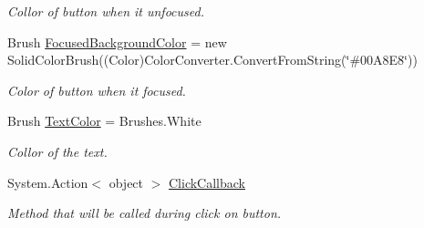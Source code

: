 \begin{DoxyCompactItemize}
\begin{DoxyCompactList}\small\item\em Collor of button when it unfocused. \end{DoxyCompactList}\item 
Brush \mbox{\hyperlink{class_teacher_handbook_1_1_controls_1_1_catalog_button_a5c4261e5d872e61b281085dc29971203}{Focused\+Background\+Color}} = new Solid\+Color\+Brush((Color)Color\+Converter.\+Convert\+From\+String(\char`\"{}\#00\+A8\+E8\char`\"{}))
\begin{DoxyCompactList}\small\item\em Color of button when it focused. \end{DoxyCompactList}\item 
Brush \mbox{\hyperlink{class_teacher_handbook_1_1_controls_1_1_catalog_button_ad9f4d0665c824c892cfcdb5c71031328}{Text\+Color}} = Brushes.\+White
\begin{DoxyCompactList}\small\item\em Collor of the text. \end{DoxyCompactList}\item 
System.\+Action$<$ object $>$ \mbox{\hyperlink{class_teacher_handbook_1_1_controls_1_1_catalog_button_afeb6f1ef9c37714972b7678d76e2f45a}{Click\+Callback}}
\begin{DoxyCompactList}\small\item\em Method that will be called during click on button. \end{DoxyCompactList}\end{DoxyCompactItemize}
